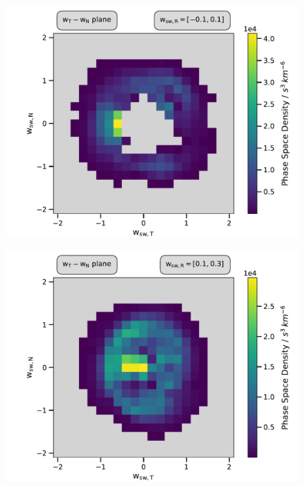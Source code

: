 \begin{figure}[h]
	\includegraphics[width=1.\textwidth]{Figures/slices_50_-1.pdf}
\end{figure}

\begin{figure}[h]
	\includegraphics[width=1.\textwidth]{Figures/slices_50_1.pdf}
\end{figure}

